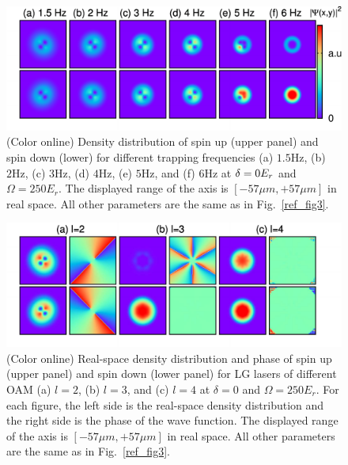 \documentclass[twocolumn,pra,unsortedaddress,showpacs,floatfix,citeautoscript,nofootinbib]{revtex4-1}
\begin{document}
\begin{figure}[t!]\vspace{-0.4cm}
\centering
\includegraphics[width=14cm]{Fig6.pdf}\vspace{-0.7cm}
\caption{(Color online) Density distribution of spin up (upper
panel) and spin down (lower) for different trapping frequencies
(a) $1.5\text{Hz}$,
(b) $2\text{Hz}$, (c) $3\text{Hz}$, (d) $4\text{Hz}$, (e) $5\text{Hz}$, and (f) $6%
\text{Hz}$ at $\protect\delta =0E_{r}$ and $\Omega =250E_{r}$. The
displayed range of the axis is $[-57\mu m, +57\mu m]$ in real
space. All other parameters are the same as in
Fig.~\ref{ref_fig3}.} \vspace{-0.0cm} \label{fig-trap}
\end{figure}

\begin{figure}[t!]\vspace{-0.2cm}
\centering
\includegraphics[width=14cm]{Fig7.pdf}\vspace{-0.7cm}
\caption{(Color online) Real-space density distribution and phase
of spin up (upper panel) and spin down (lower panel) for LG lasers
of different OAM (a) $l=2$, (b) $l=3$, and (c) $l=4$ at $\delta
=0$ and $\Omega =250E_{r}$. For each figure, the left side is the
real-space density distribution and the right side is the phase of
the wave function. The displayed range of the axis is $[-57\mu m,
+57\mu m]$ in real space. All other parameters are the same as in
Fig.~\ref{ref_fig3}.}\vspace{-0.4cm} \label{fig-OAM}
\end{figure}
\end{document}
